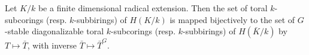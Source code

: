 Let $K/k$ be a finite dimensional radical extension. Then the set of toral $k$-subcorings (resp. $k$-subbirings) of $H(K/k)$ is mapped bijectively to the set of $G$-stable diagonalizable toral $k$-subcorings (resp. $k$-subbirings) of $H(\bar{K}/k)$ by $T \mapsto \bar{T}$, with inverse $\bar{T} \mapsto \bar{T}^G$.
